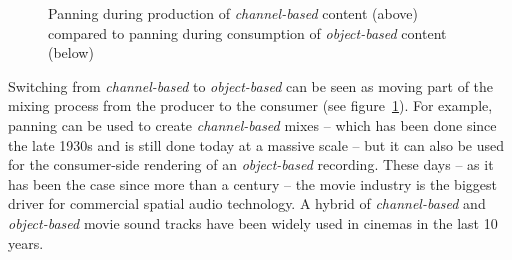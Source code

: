 \begin{figure}[htbp]
\centering
{}
\caption{Panning during production of \emph{channel-based} content (above)
compared to panning during consumption of \emph{object-based} content (below)}
\label{fig:channel-vs-object}
\end{figure}

Switching from \emph{channel-based} to \emph{object-based}
can be seen as moving part of the mixing process
from the producer to the consumer
(see figure~\ref{fig:channel-vs-object}).
For example, panning can be used to create \emph{channel-based} mixes
-- which has been done since the late 1930s and is still done today at
a massive scale --
but it can also be used for the consumer-side rendering
of an \emph{object-based} recording.
These days -- as it has been the case since more than a century --
the movie industry is the biggest driver
for commercial spatial audio technology.
A hybrid of \emph{channel-based} and \emph{object-based}
movie sound tracks \parencite{robinson2012atmos}
have been widely used in cinemas in the last 10 years.
